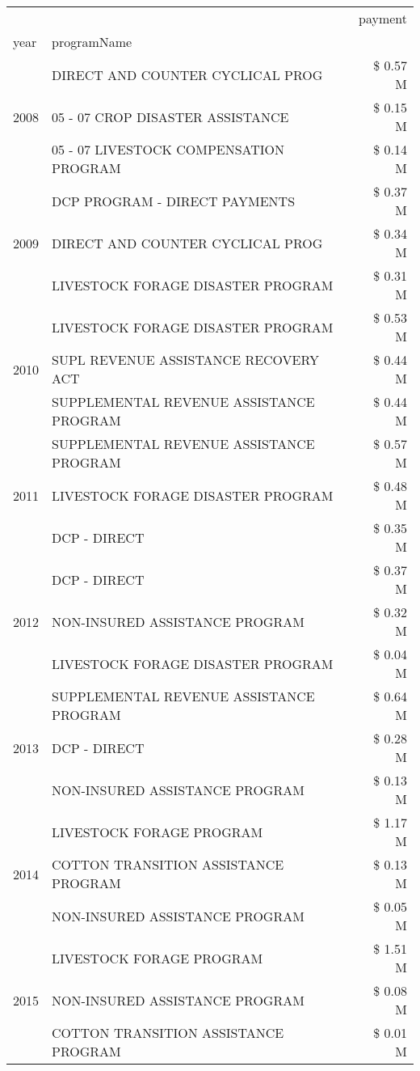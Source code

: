 \begin{tabular}{llr}
\toprule
 &  & payment \\
year & programName &  \\
\midrule
\multirow[t]{3}{*}{2008} & DIRECT AND COUNTER CYCLICAL PROG & \$ 0.57 M \\
 & 05 - 07 CROP DISASTER ASSISTANCE & \$ 0.15 M \\
 & 05 - 07 LIVESTOCK COMPENSATION PROGRAM & \$ 0.14 M \\
\cline{1-3}
\multirow[t]{3}{*}{2009} & DCP PROGRAM - DIRECT PAYMENTS & \$ 0.37 M \\
 & DIRECT AND COUNTER CYCLICAL PROG & \$ 0.34 M \\
 & LIVESTOCK FORAGE DISASTER  PROGRAM & \$ 0.31 M \\
\cline{1-3}
\multirow[t]{3}{*}{2010} & LIVESTOCK FORAGE DISASTER  PROGRAM & \$ 0.53 M \\
 & SUPL REVENUE ASSISTANCE RECOVERY ACT & \$ 0.44 M \\
 & SUPPLEMENTAL REVENUE ASSISTANCE PROGRAM & \$ 0.44 M \\
\cline{1-3}
\multirow[t]{3}{*}{2011} & SUPPLEMENTAL REVENUE ASSISTANCE PROGRAM & \$ 0.57 M \\
 & LIVESTOCK FORAGE DISASTER PROGRAM & \$ 0.48 M \\
 & DCP - DIRECT & \$ 0.35 M \\
\cline{1-3}
\multirow[t]{3}{*}{2012} & DCP - DIRECT & \$ 0.37 M \\
 & NON-INSURED ASSISTANCE PROGRAM & \$ 0.32 M \\
 & LIVESTOCK FORAGE DISASTER PROGRAM & \$ 0.04 M \\
\cline{1-3}
\multirow[t]{3}{*}{2013} & SUPPLEMENTAL REVENUE ASSISTANCE PROGRAM & \$ 0.64 M \\
 & DCP - DIRECT & \$ 0.28 M \\
 & NON-INSURED ASSISTANCE PROGRAM & \$ 0.13 M \\
\cline{1-3}
\multirow[t]{3}{*}{2014} & LIVESTOCK FORAGE PROGRAM & \$ 1.17 M \\
 & COTTON TRANSITION ASSISTANCE PROGRAM & \$ 0.13 M \\
 & NON-INSURED ASSISTANCE PROGRAM & \$ 0.05 M \\
\cline{1-3}
\multirow[t]{3}{*}{2015} & LIVESTOCK FORAGE PROGRAM & \$ 1.51 M \\
 & NON-INSURED ASSISTANCE PROGRAM & \$ 0.08 M \\
 & COTTON TRANSITION ASSISTANCE PROGRAM & \$ 0.01 M \\

\end{tabular}
